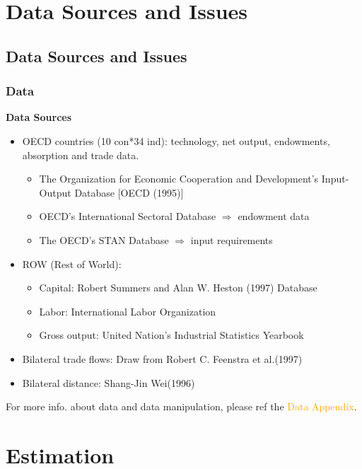 \documentclass[xcolor=svgnames,10pt]{beamer}
\begin{document}
\section{Data Sources and Issues}
\subsection{Data Sources and Issues}
\begin{frame}[c]\frametitle{Data}
\textbf{Data Sources}
\begin{itemize}
    \item OECD countries (10 con*34 ind): technology, net output, endowments, absorption and trade data.
    \begin{itemize}
    \item The Organization for Economic Cooperation and Development\rq{}s Input-Output Database [OECD (1995)]
    \item OECD\rq{}s International Sectoral Database $\Rightarrow$ endowment data
    \item The OECD\rq{}s STAN Database $\Rightarrow$ input requirements
    \end{itemize}
    \item ROW (Rest of World):
    \begin{itemize}
    \item Capital: Robert Summers and Alan W. Heston (1997) Database
    \item Labor: International Labor Organization
    \item Gross output: United Nation\rq{}s Industrial Statistics Yearbook
    \end{itemize}
    \item Bilateral trade flows: Draw from Robert C. Feenstra et al.(1997)
    \item Bilateral distance: Shang-Jin Wei(1996)
\end{itemize}

For more info. about data and data manipulation, please ref the \textcolor{orange}{Data Appendix}.
\end{frame}

\section{Estimation}
\end{document}
